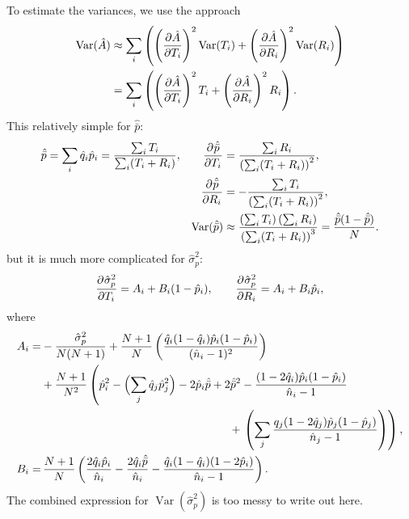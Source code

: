\documentclass[12pt]{article}
\newcommand{\pdiff}[3][\rule{0mm}{0mm}]{\frac{\partial^{#1} #2}{\partial {#3}^{#1}}}
\newcommand{\pdiffc}[3][\rule{0mm}{0mm}]{\left (\frac{\partial #2}{\partial {#3}}\right )_{\!\!#1}}
\DeclareMathOperator{\var}{Var}
\newcommand{\prn}[1]{\left ( #1 \right )}
\begin{document}
To estimate the variances, we use the approach
%
\begin{equation}\label{eq:estvarest}
\begin{aligned}
  \var(\hat{A}) &\approx \sum_i\prn{ \pdiffc{\hat{A}}{T_i}^2 \var(T_i) + \pdiffc{\hat{A}}{R_i}^2 \var(R_i) }
  \\&= \sum_i\prn{ \pdiffc{\hat{A}}{T_i}^2 T_i + \pdiffc{\hat{A}}{R_i}^2 R_i }.
\end{aligned}
\end{equation}
%
This relatively simple for $\hat{\bar{p}}$:
%
\begin{equation}\label{eq:varpbar}
  \begin{aligned}
    \hat{\bar{p}} &= \sum_i \hat{q}_i \hat{p}_i = \frac{\sum_iT_i}{\sum_i(T_i+R_i)}, &
    \pdiff{\hat{\bar{p}}}{T_i}  &= \frac{\sum_iR_i}{\prn{\sum_i(T_i+R_i)}^2},\\&&
    \pdiff{\hat{\bar{p}}}{R_i}  &= -\frac{\sum_iT_i}{\prn{\sum_i(T_i+R_i)}^2},\\&&
    \var(\hat{\bar{p}}) &\approx \frac{\prn{\sum_iT_i}\prn{\sum_iR_i}}{\prn{\sum_i(T_i+R_i)}^3} = \frac{\hat{\bar{p}}(1-\hat{\bar{p}})}{N}.
  \end{aligned}
\end{equation}
%
but it is much more complicated for $\hat{\sigma}_p^2$:
%
\begin{equation}\label{eq:varsigmap}
    \pdiff{\hat{\sigma}_p^2}{T_i} = A_i+ B_i(1-\hat{p}_i),
    \qquad
    \pdiff{\hat{\sigma}_p^2}{R_i} = A_i+ B_i \hat{p}_i,
\end{equation}
%
where
%
\begin{equation}\label{eq:varisigmacoeffs}
  \begin{aligned}
    A_i =& -\frac{\hat{\sigma}_p^2}{N(N+1)} + \frac{N+1}{N} \prn{\frac{\hat{q}_i (1-\hat{q}_i) \hat{p}_i (1-\hat{p}_i)} {(\hat{n}_i-1)^2}}
    \\ &+
    \frac{N+1}{N^2} \prn{ \hat{p}_i^2 - \Bigl(\sum_j \hat{q}_j\hat{p}_j^2\Bigr) - 2 \hat{p}_i\hat{\bar{p}} + 2 \hat{\bar{p}}^2 - \frac{(1-2\hat{q}_i) \hat{p}_i (1-\hat{p}_i)} {\hat{n}_i-1}
    \right.\\&
    \phantom{\prn{\frac{N+1}{N^2}}\hat{p}_i^2 - (\sum_j \hat{q}_j\hat{p}_j^2)- 2 \hat{p}_i\hat{\bar{p}} + 2 \hat{\bar{p}}^2}
    +\left.
    \prn{\sum_j \frac{q_j(1-2\hat{q}_j) \hat{p}_j (1-\hat{p}_j)} {\hat{n}_j-1} }
    },\\
    B_i =&\, \frac{N+1}{N} \prn{  \frac{2\hat{q}_i \hat{p}_i } {\hat{n}_i} - \frac{2\hat{q}_i \hat{\bar{p}} } {\hat{n}_i} -  \frac{\hat{q}_i(1-\hat{q}_i) (1-2\hat{p}_i) } {\hat{n}_i-1}
    }.
  \end{aligned}
\end{equation}
%
The combined expression for $\var(\hat{\sigma}_p^2)$ is too messy to write out here.
\end{document}
